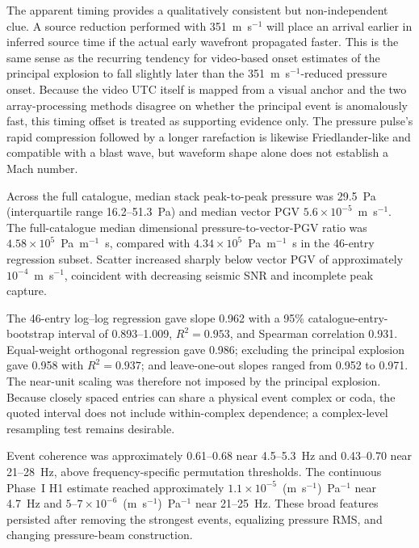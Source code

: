 \documentclass[]{seismica}
\begin{document}
The apparent timing provides a qualitatively consistent but non-independent
clue. A source reduction performed with 351~m~s$^{-1}$ will place an arrival
earlier in inferred source time if the actual early wavefront propagated
faster. This is the same sense as the recurring tendency for video-based onset
estimates of the principal explosion to fall slightly later than the
351~m~s$^{-1}$-reduced pressure onset. Because the video UTC itself is mapped
from a visual anchor and the two array-processing methods disagree on whether
the principal event is anomalously fast, this timing offset is treated as
supporting evidence only. The pressure pulse's rapid compression followed by
a longer rarefaction is likewise Friedlander-like and compatible with a blast
wave, but waveform shape alone does not establish a Mach number.

Across the full catalogue, median stack peak-to-peak pressure was 29.5~Pa
(interquartile range 16.2--51.3~Pa) and median vector PGV
$5.6\times10^{-5}$~m~s$^{-1}$. The full-catalogue median dimensional
pressure-to-vector-PGV ratio was
$4.58\times10^5$~Pa~m$^{-1}$~s, compared with
$4.34\times10^5$~Pa~m$^{-1}$~s in the 46-entry regression subset. Scatter
increased sharply below vector PGV of approximately $10^{-4}$~m~s$^{-1}$,
coincident with decreasing seismic SNR and incomplete peak capture.

The 46-entry log--log regression gave slope 0.962 with a 95\%
catalogue-entry-bootstrap
interval of 0.893--1.009, $R^2=0.953$, and Spearman correlation 0.931.
Equal-weight orthogonal regression gave 0.986; excluding the principal
explosion gave 0.958 with $R^2=0.937$; and leave-one-out slopes ranged from
0.952 to 0.971. The near-unit scaling was therefore not imposed by the
principal explosion. Because closely spaced entries can share a physical event
complex or coda, the quoted interval does not include within-complex
dependence; a complex-level resampling test remains desirable.

Event coherence was approximately 0.61--0.68 near 4.5--5.3~Hz and
0.43--0.70 near 21--28~Hz, above frequency-specific permutation thresholds.
The continuous Phase~I H1 estimate reached approximately
$1.1\times10^{-5}$~(m~s$^{-1}$)~Pa$^{-1}$ near 4.7~Hz and
$5$--$7\times10^{-6}$~(m~s$^{-1}$)~Pa$^{-1}$ near 21--25~Hz. These broad
features persisted after removing the strongest events, equalizing pressure
RMS, and changing pressure-beam construction.
\end{document}
